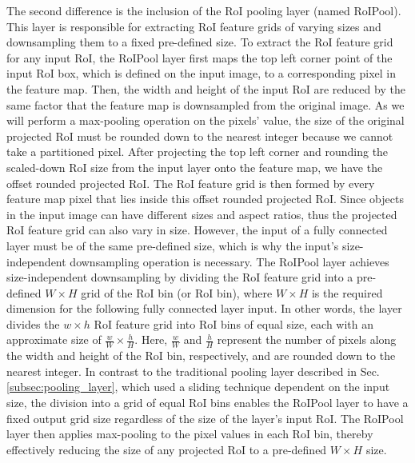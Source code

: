 The second difference is the inclusion of the RoI pooling layer (named RoIPool). This layer is responsible for extracting RoI feature grids of varying sizes and downsampling them to a fixed pre-defined size. To extract the RoI feature grid for any input RoI, the RoIPool layer first maps the top left corner point of the input RoI box, which is defined on the input image, to a corresponding pixel in the feature map. Then, the width and height of the input RoI are reduced by the same factor that the feature map is downsampled from the original image. As we will perform a max-pooling operation on the pixels' value, the size of the original projected RoI must be rounded down to the nearest integer because we cannot take a partitioned pixel. After projecting the top left corner and rounding the scaled-down RoI size from the input layer onto the feature map, we have the offset rounded projected RoI. The RoI feature grid is then formed by every feature map pixel that lies inside this offset rounded projected RoI. Since objects in the input image can have different sizes and aspect ratios, thus the projected RoI feature grid can also vary in size. However, the input of a fully connected layer must be of the same pre-defined size, which is why the input's size-independent downsampling operation is necessary. The RoIPool layer achieves size-independent downsampling by dividing the RoI feature grid into a pre-defined $W \times H$ grid of the RoI bin (or RoI bin), where $W \times H$ is the required dimension for the following fully connected layer input. In other words, the layer divides the $w \times h$ RoI feature grid into RoI bins of equal size, each with an approximate size of $\frac{w}{W} \times \frac{h}{H}$. Here, $\frac{w}{W}$ and $\frac{h}{H}$ represent the number of pixels along the width and height of the RoI bin, respectively, and are rounded down to the nearest integer. In contrast to the traditional pooling layer described in Sec. \ref{subsec:pooling_layer}, which used a sliding technique dependent on the input size, the division into a grid of equal RoI bins enables the RoIPool layer to have a fixed output grid size regardless of the size of the layer's input RoI. The RoIPool layer then applies max-pooling to the pixel values in each RoI bin, thereby effectively reducing the size of any projected RoI to a pre-defined $W \times H$ size.

